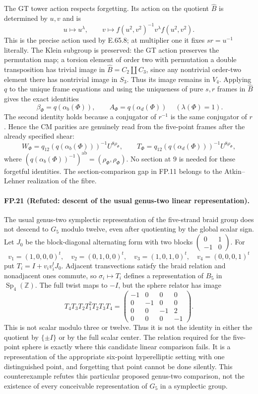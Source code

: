 The GT tower action respects forgetting. Its action on the quotient
$\widehat B$ is determined by $u,v$ and is
\[
 u\longmapsto u^\lambda,\qquad
 v\longmapsto f(u^2,v^2)^{-1}v^\lambda f(u^2,v^2).
\]
This is the precise action used by E.65.8; at multiplier one it fixes
$sr=u^{-1}$ literally. The Klein subgroup is preserved: the GT action
preserves the permutation map; a torsion element of order two with
permutation a double transposition has trivial image in
$\widehat B=C_2\amalg C_3$, since any nontrivial order-two element there
has nontrivial image in $S_3$. Thus its image remains in $V_4$.
Applying $q$ to the unique frame equations and using the uniqueness of
pure $s,r$ frames in $\widehat B$ gives the exact identities
\[
 \boxed{\ \beta_\Phi=q(\alpha_b(\Phi)),\qquad
 A_\Phi=q(\alpha_d(\Phi))\ }
 \quad(\lambda(\Phi)=1).
\]
The second identity holds because a conjugator of $r^{-1}$ is the same
conjugator of $r$. Hence the CM parities are genuinely read from the
five-point frames after the already specified shear:
\[
 W_\Phi=q_{12}(q(\alpha_b(\Phi)))^{-1}U^{8\rho_\Phi},\qquad
 T_\Phi=q_{12}(q(\alpha_d(\Phi)))^{-1}U^{8\rho_\Phi},
\]
where $(q(\alpha_b(\Phi))^{-1})^{\mathrm{ab}}
=(\rho_\Phi,\rho_\Phi)$. No section at $9$ is needed for these
forgetful identities. The section-comparison gap in FP.11 belongs to
the Atkin--Lehner realization of the fibre.

\paragraph{FP.21 (Refuted: descent of the usual genus-two linear representation).}
The usual genus-two symplectic representation of the five-strand braid
group does not descend to $G_5$ modulo twelve, even after quotienting by
the global scalar sign. Let $J_0$ be the block-diagonal alternating form
with two blocks $\left(\begin{smallmatrix}0&1\\-1&0\end{smallmatrix}\right)$.
For
\[
 v_1=(1,0,0,0)^t,\quad v_2=(0,1,0,0)^t,\quad
 v_3=(1,0,1,0)^t,\quad v_4=(0,0,0,1)^t
\]
put $T_i=I+v_i v_i^tJ_0$. Adjacent transvections satisfy the braid
relation and nonadjacent ones commute, so $\sigma_i\mapsto T_i$
defines a representation of $B_5$ in $\operatorname{Sp}_4(\mathbb Z)$.
The full twist maps to $-I$, but the sphere relator has image
\[
 T_4T_3T_2T_1^2T_2T_3T_4
 =\begin{pmatrix}
 -1&0&0&0\\0&-1&0&0\\0&0&-1&2\\0&0&0&-1
 \end{pmatrix}.
\]
This is not scalar modulo three or twelve. Thus it is not the identity
in either the quotient by $\{\pm I\}$ or by the full scalar center.
The relation required for the five-point sphere is exactly where this
candidate linear comparison fails. It is a representation of the
appropriate six-point hyperelliptic setting with one distinguished point,
and forgetting that point cannot be done silently. This counterexample
refutes this particular proposed genus-two comparison, not the existence
of every conceivable representation of $G_5$ in a symplectic group.

